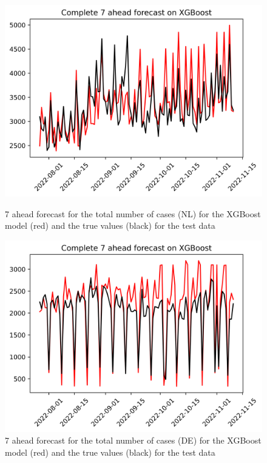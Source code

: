 \begin{figure}

\begin{minipage}{.32\textwidth}
  \centering
  \includegraphics[width=\linewidth]{pics/7_ah/Complete_7_ahead_XGBoost.png}
  \caption{7 ahead forecast for the total number of cases (NL) for the XGBoost model (red) and the true values (black) for the test data}
  \label{fig:tot_cases_fc_7_xgb}
\end{minipage}
\begin{minipage}{.32\textwidth}
  \centering
  \includegraphics[width=\linewidth]{pics/7_ah/DE_Complete_7_ahead_XGBoost.png}
  \caption{7 ahead forecast for the total number of cases (DE) for the XGBoost model (red) and the true values (black) for the test data}

\end{minipage}
\end{figure}
